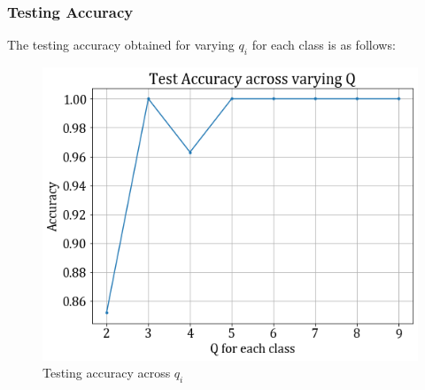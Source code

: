 \documentclass[11pt,a4paper]{article}
\begin{document}
\subsubsection{Testing Accuracy}
The testing accuracy obtained for varying $q_i$ for each class is as follows:
\begin{figure}[H]
    \centering
    \includegraphics[scale=0.45]{images/1b_full_test.png}
    \caption{Testing accuracy across $q_i$}
\end{figure}
\end{document}
